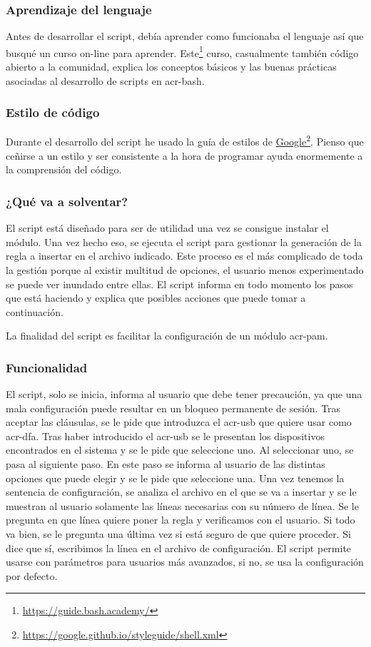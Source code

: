 \documentclass[twoside, titlepage, 12pt, a4paper]{article}
\begin{document}
{\subsubsection{Aprendizaje del lenguaje}
Antes de desarrollar el \gls{script}, debía aprender como funcionaba el lenguaje así que busqué un curso on-line para aprender. 
Este\footnote{\url{https://guide.bash.academy/}} curso, casualmente también código abierto a la comunidad, explica los conceptos básicos y las buenas prácticas asociadas al desarrollo de \gls{script}s en \gls{acr-bash}.\par
\subsubsection{Estilo de código}
Durante el desarrollo del \gls{script} he usado la guía de estilos de \href{https://www.google.com}{Google}\footnote{\url{https://google.github.io/styleguide/shell.xml}}. Pienso que ceñirse a un estilo y ser consistente a la hora de programar ayuda enormemente a la comprensión del código.\par
\subsubsection{¿Qué va a solventar?}
El \gls{script} está diseñado para ser de utilidad una vez se consigue instalar el módulo. Una vez hecho eso, se ejecuta el \gls{script} para gestionar la generación de la regla a insertar en el archivo indicado. Este proceso es el más complicado de toda la gestión porque al existir multitud de opciones, el usuario menos experimentado se puede ver inundado entre ellas. El \gls{script} informa en todo momento los pasos que está haciendo y explica que posibles acciones que puede tomar a continuación. \par
La finalidad del \gls{script} es facilitar la configuración de un módulo \gls{acr-pam}.
\subsubsection{Funcionalidad}
El \gls{script}, solo se inicia, informa al usuario que debe tener precaución, ya que una mala configuración puede resultar en un bloqueo permanente de sesión. Tras aceptar las cláusulas, se le pide que introduzca el \gls{acr-usb} que quiere usar como \gls{acr-dfa}. Tras haber introducido el \gls{acr-usb} se le presentan los dispositivos encontrados en el sistema y se le pide que seleccione uno. Al seleccionar uno, se pasa al siguiente paso. En este paso se informa al usuario de las distintas opciones que puede elegir y se le pide que seleccione una. Una vez tenemos la sentencia de configuración, se analiza el archivo en el que se va a insertar y se le muestran al usuario solamente las líneas necesarias con su número de línea. Se le pregunta en que línea quiere poner la regla y verificamos con el usuario. Si todo va bien, se le pregunta una última vez si está seguro de que quiere proceder. Si dice que sí, escribimos la línea en el archivo de configuración. El \gls{script} permite usarse con parámetros para usuarios más avanzados, si no, se usa la configuración por defecto.
}
\end{document}
